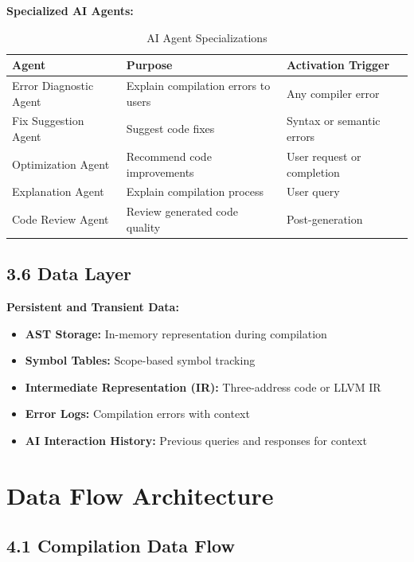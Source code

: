\documentclass[a4paper,11pt]{article}
\begin{document}
\textbf{Specialized AI Agents:}

\begin{table}[h]
\centering
\begin{tabularx}{\textwidth}{|l|X|X|}
\hline
\rowcolor{blue!10}
\textbf{Agent} & \textbf{Purpose} & \textbf{Activation Trigger} \\
\hline
Error Diagnostic Agent & Explain compilation errors to users & Any compiler error \\
\hline
Fix Suggestion Agent & Suggest code fixes & Syntax or semantic errors \\
\hline
Optimization Agent & Recommend code improvements & User request or completion \\
\hline
Explanation Agent & Explain compilation process & User query \\
\hline
Code Review Agent & Review generated code quality & Post-generation \\
\hline
\end{tabularx}
\caption{AI Agent Specializations}
\end{table}

\subsection{3.6 Data Layer}

\textbf{Persistent and Transient Data:}

\begin{itemize}[leftmargin=*]
    \item \textbf{AST Storage:} In-memory representation during compilation
    \item \textbf{Symbol Tables:} Scope-based symbol tracking
    \item \textbf{Intermediate Representation (IR):} Three-address code or LLVM IR
    \item \textbf{Error Logs:} Compilation errors with context
    \item \textbf{AI Interaction History:} Previous queries and responses for context
\end{itemize}

\section{Data Flow Architecture}

\subsection{4.1 Compilation Data Flow}
\end{document}
